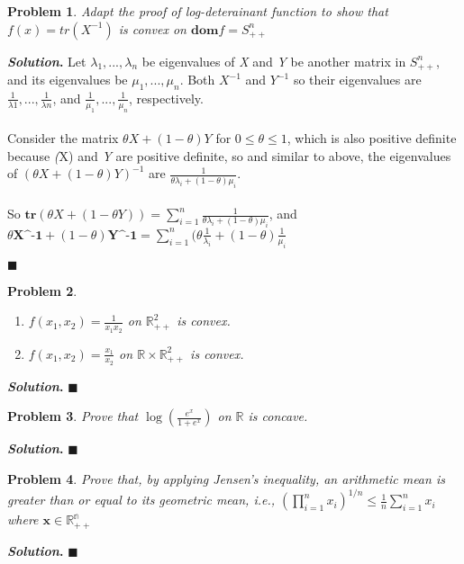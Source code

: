\documentclass[12pt]{article}
\newtheorem{problem}{Problem}
\newenvironment{solution}[1][\textit{Solution}]{\textbf{#1. }}{$\blacksquare$}
\begin{document}
  \begin{problem}
    Adapt the proof of log-deterainant function to show that $f(x) = tr(X^{-1})$ is convex on $\textbf{dom}f = S^{n}_{++}$
    \end{problem}
  \begin{solution}
    Let $\lambda_{1}, ..., \lambda_{n}$ be eigenvalues of \textit{X} and \textit{Y} be another matrix in $S^{n}_{++}$, and its eigenvalues be $\mu_{1}, ..., \mu_{n}$.
    Both $X^{-1}$ and $Y^{-1}$ so their eigenvalues are $ \frac{1}{\lambda{1}}, ..., \frac{1}{\lambda{n}}$, and $\frac{1}{\mu_{1}}, ..., \frac{1}{\mu_{n}}$, respectively.
    \\ 
    \\ 
    Consider the matrix $\theta X + (1 - \theta)Y$ for $0 \leq \theta \leq 1$, which is also positive definite because \textit(X) and \textit{Y} are positive definite, so and similar to above, the eigenvalues of $(\theta X + (1 - \theta) Y)^{-1}$ are $\frac{1}{\theta \lambda_{i} + (1 - \theta)\mu_{i}}$.
    \\ 
    \\
    So $\textbf{tr}(\theta X + (1 - \theta Y)) = \sum_{i=1}^{n} \frac{1}{\theta \lambda_{i} + (1 - \theta)\mu_{i}}$, and $\theta \textbf{X^{-1}} + (1 - \theta)\textbf{Y^{-1}} = \sum_{i=1}^{n} (\theta \frac{1}{\lambda_{i}} + (1 - \theta) \frac{1}{\mu_{i}}$

  \end{solution}

  \begin{problem}
    \begin{enumerate}
      \item $f(x_1, x_2) = \frac{1}{x_{1}x_{2}}$ on $\mathbb{R}^{2}_{++}$ is convex. 
      \item $f(x_1, x_2) = \frac{x_1}{x_{2}}$  on $\mathbb{R} \times \mathbb{R}^{2}_{++}$ is convex. 
    \end{enumerate}
  \end{problem}
  \begin{solution}
  \end{solution}

  \begin{problem}
    Prove that $\log(\frac{e^x}{1 + e^x})$ on $\mathbb{R}$ is concave.
  \end{problem}
  \begin{solution}
  \end{solution}

  \begin{problem}
    Prove that, by applying Jensen’s inequality, an arithmetic mean is greater than or equal to its geometric mean, i.e., $(\prod_{i=1}^{n} x_{i})^{1/n} \leq \frac{1}{n}\sum_{i=1}^{n} x_{i}$ where $\textbf{x} \in \mathbb{R^{n}_{++}}$
  \end{problem}
  \begin{solution}
  \end{solution}
  
\end{document}
